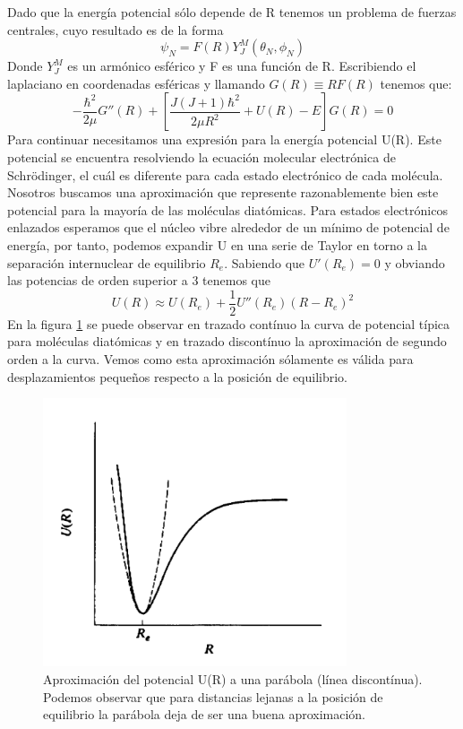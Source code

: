 \documentclass[a4paper]{article}
\begin{document}
Dado que la energía potencial sólo depende de R tenemos un problema de fuerzas centrales, cuyo resultado es de la forma
\begin{equation}
\psi_N=F(R)Y^M_J(\theta_N,\phi_N)
\end{equation}
Donde $Y^M_J$ es un armónico esférico y F es una función de R.
Escribiendo el laplaciano en coordenadas esféricas y llamando $G(R)\equiv RF(R)$ tenemos que:
\begin{equation}
-\frac{\hbar^2}{2\mu}G''(R)+\left[\frac{J(J+1)\hbar^2}{2\mu R^2}+U(R)-E\right]G(R)=0
\end{equation}
Para continuar necesitamos una expresión para la energía potencial U(R). Este potencial se encuentra resolviendo la ecuación molecular electrónica de Schrödinger, el cuál es diferente para cada estado electrónico de cada molécula. Nosotros buscamos una aproximación que represente razonablemente bien este potencial para la mayoría de las moléculas diatómicas. Para estados electrónicos enlazados esperamos que el núcleo vibre alrededor de un mínimo de potencial de energía, por tanto, podemos expandir U en una serie de Taylor en torno a la separación internuclear de equilibrio $R_e$. Sabiendo que $U'(R_e)=0$ y obviando las potencias de orden superior a 3 tenemos que
\begin{equation}\label{aproximacion1}
U(R) \approx U(R_e)+\frac{1}{2}U''(R_e)(R-R_e)^2
\end{equation}
En la figura \ref{potencial} se puede observar en trazado contínuo la curva de potencial típica para moléculas diatómicas y en trazado discontínuo la aproximación de segundo orden a la curva. Vemos como esta aproximación sólamente es válida para desplazamientos pequeños respecto a la posición de equilibrio.
\begin{figure}
\includegraphics[width=0.8\textwidth]{curva_potencial.png}
\caption{Aproximación del potencial U(R) a una parábola (línea discontínua). Podemos observar que para distancias lejanas a la posición de equilibrio la parábola deja de ser una buena aproximación.}
\label{potencial}
\end{figure}
\end{document}
